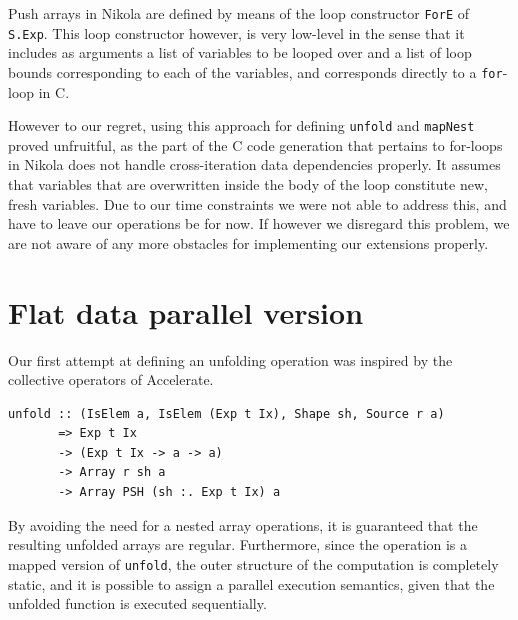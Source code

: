 Push arrays in Nikola are defined by means of the loop constructor
\lstinline{ForE} of \lstinline{S.Exp}. This loop constructor however, is very
low-level in the sense that it includes as arguments a list of variables to be
looped over and a list of loop bounds corresponding to each of the variables,
and corresponds directly to a \lstinline{for}-loop in C.


However to our regret, using this approach for defining \lstinline{unfold} and
\lstinline{mapNest} proved unfruitful, as the part of the C code generation that
pertains to for-loops in Nikola does not handle cross-iteration data
dependencies properly. It assumes that variables that are overwritten inside
the body of the loop constitute new, fresh variables. Due to our time
constraints we were not able to address this, and have to leave our operations
be for now. If however we disregard this problem, we are not aware of any more
obstacles for implementing our extensions properly.

\section{Flat data parallel version}
Our first attempt at defining an unfolding operation was inspired by the
collective operators of Accelerate.

\begin{lstlisting}
unfold :: (IsElem a, IsElem (Exp t Ix), Shape sh, Source r a)
       => Exp t Ix
       -> (Exp t Ix -> a -> a)
       -> Array r sh a
       -> Array PSH (sh :. Exp t Ix) a
\end{lstlisting}

By avoiding the need for a nested array operations, it is guaranteed
that the resulting unfolded arrays are regular. Furthermore, since the
operation is a mapped version of \lstinline{unfold}, the outer
structure of the computation is completely static, and it is possible
to assign a parallel execution semantics, given that the unfolded
function is executed sequentially.

